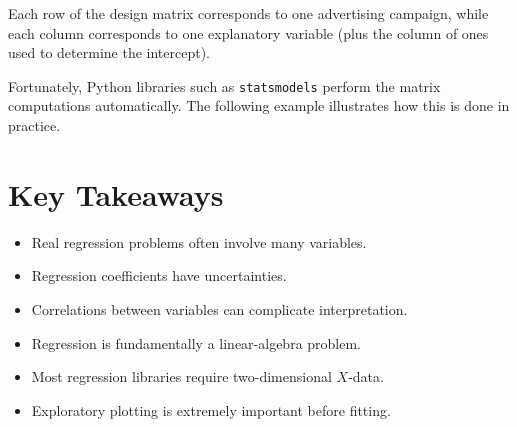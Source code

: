 \documentclass[11pt]{article}
\begin{document}
Each row of the design matrix corresponds to one advertising campaign, while
each column corresponds to one explanatory variable (plus the column of ones
used to determine the intercept).

Fortunately, Python libraries such as \lstinline|statsmodels| perform the
matrix computations automatically. The following example illustrates how this
is done in practice.

\section{Key Takeaways}

\begin{itemize}
    \item Real regression problems often involve many variables.
    \item Regression coefficients have uncertainties.
    \item Correlations between variables can complicate interpretation.
    \item Regression is fundamentally a linear-algebra problem.
    \item Most regression libraries require two-dimensional \(X\)-data.
    \item Exploratory plotting is extremely important before fitting.
\end{itemize}
\end{document}
